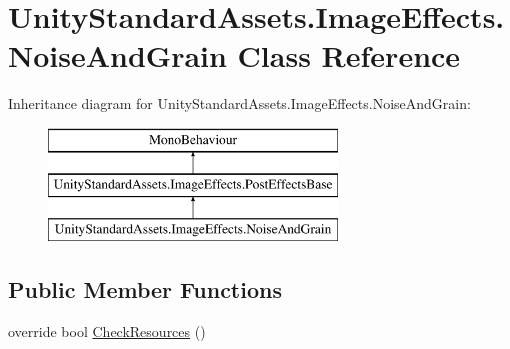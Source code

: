 \hypertarget{class_unity_standard_assets_1_1_image_effects_1_1_noise_and_grain}{}\section{Unity\+Standard\+Assets.\+Image\+Effects.\+Noise\+And\+Grain Class Reference}
\label{class_unity_standard_assets_1_1_image_effects_1_1_noise_and_grain}
Inheritance diagram for Unity\+Standard\+Assets.\+Image\+Effects.\+Noise\+And\+Grain\+:\begin{figure}[H]
\begin{center}
\leavevmode
\includegraphics[height=3.000000cm]{class_unity_standard_assets_1_1_image_effects_1_1_noise_and_grain}
\end{center}
\end{figure}
\subsection*{Public Member Functions}
\begin{DoxyCompactItemize}
\item 
override bool \mbox{\hyperlink{class_unity_standard_assets_1_1_image_effects_1_1_noise_and_grain_ab7994ccecddd5183487f9dfee8bf7ab5}{Check\+Resources}} ()
\end{DoxyCompactItemize}
